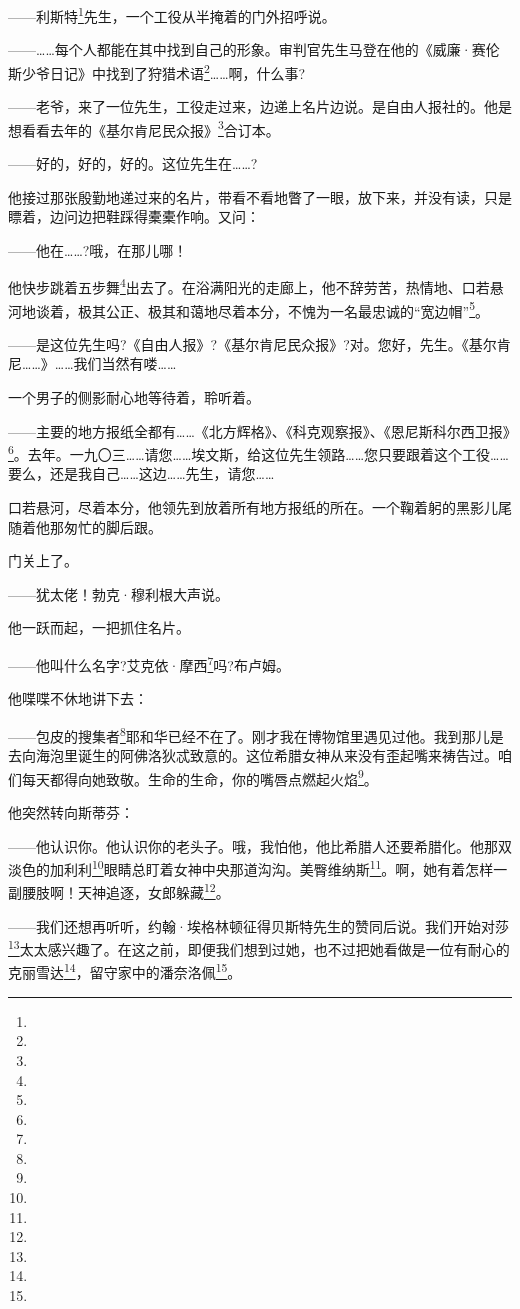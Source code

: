 \par ——利斯特\footnote{}先生，一个工役从半掩着的门外招呼说。
\par ——……每个人都能在其中找到自己的形象。审判官先生马登在他的《威廉·赛伦斯少爷日记》中找到了狩猎术语\footnote{}……啊，什么事?
\par ——老爷，来了一位先生，工役走过来，边递上名片边说。是自由人报社的。他是想看看去年的《基尔肯尼民众报》\footnote{}合订本。
\par ——好的，好的，好的。这位先生在……?
\par 他接过那张殷勤地递过来的名片，带看不看地瞥了一眼，放下来，并没有读，只是瞟着，边问边把鞋踩得橐橐作响。又问：
\par ——他在……?哦，在那儿哪！
\par 他快步跳着五步舞\footnote{}出去了。在浴满阳光的走廊上，他不辞劳苦，热情地、口若悬河地谈着，极其公正、极其和蔼地尽着本分，不愧为一名最忠诚的“宽边帽”\footnote{}。
\par ——是这位先生吗?《自由人报》?《基尔肯尼民众报》?对。您好，先生。《基尔肯尼……》……我们当然有喽……
\par 一个男子的侧影耐心地等待着，聆听着。
\par ——主要的地方报纸全都有……《北方辉格》、《科克观察报》、《恩尼斯科尔西卫报》\footnote{}。去年。一九〇三……请您……埃文斯，给这位先生领路……您只要跟着这个工役……要么，还是我自己……这边……先生，请您……
\par 口若悬河，尽着本分，他领先到放着所有地方报纸的所在。一个鞠着躬的黑影儿尾随着他那匆忙的脚后跟。
\par 门关上了。
\par ——犹太佬！勃克·穆利根大声说。
\par 他一跃而起，一把抓住名片。
\par ——他叫什么名字?艾克依·摩西\footnote{}吗?布卢姆。
\par 他喋喋不休地讲下去：
\par ——包皮的搜集者\footnote{}耶和华已经不在了。刚才我在博物馆里遇见过他。我到那儿是去向海泡里诞生的阿佛洛狄忒致意的。这位希腊女神从来没有歪起嘴来祷告过。咱们每天都得向她致敬。生命的生命，你的嘴唇点燃起火焰\footnote{}。
\par 他突然转向斯蒂芬：
\par ——他认识你。他认识你的老头子。哦，我怕他，他比希腊人还要希腊化。他那双淡色的加利利\footnote{}眼睛总盯着女神中央那道沟沟。美臀维纳斯\footnote{}。啊，她有着怎样一副腰肢啊！天神追逐，女郎躲藏\footnote{}。
\par ——我们还想再听听，约翰·埃格林顿征得贝斯特先生的赞同后说。我们开始对莎\footnote{}太太感兴趣了。在这之前，即便我们想到过她，也不过把她看做是一位有耐心的克丽雪达\footnote{}，留守家中的潘奈洛佩\footnote{}。
